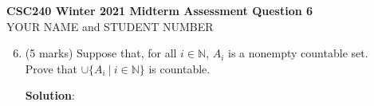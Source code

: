 \documentclass[11pt]{article}
\def\nats{{\mathbb N}}
\begin{document}
\begin{center}
{\bf \Large \bf CSC240 Winter 2021 Midterm Assessment Question 6}\\
YOUR NAME and STUDENT NUMBER
\end{center}

\medskip

\begin{enumerate}
\setcounter{enumi}{5}

\item
\begin{question}
(5 marks)
Suppose that, for all $i \in \nats$, $A_i$ is a nonempty countable set.\\
Prove that $\cup\{A_i\ |\ i \in \nats\}$ is countable.
\end{question}

\begin{solution}
{\bf Solution}:

\end{solution}
\end{enumerate}
\end{document}
